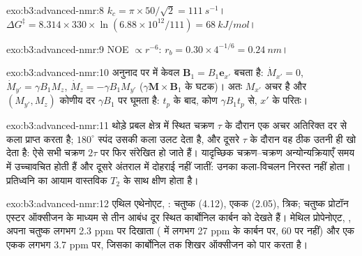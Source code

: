 \begin{solution}{exo:b3:advanced-nmr:8}
$k_c = \pi \times 50/\sqrt2 = \qty{111}{s^{-1}}$। $\Delta G^\ddagger = 8.314 \times 330 \times
\ln(6.88\times10^{12}/111) = \qty{68}{kJ/mol}$।
\end{solution}

\begin{solution}{exo:b3:advanced-nmr:9}
NOE $\propto r^{-6}$: $r_b = 0.30 \times 4^{-1/6} = \qty{0.24}{nm}$।
\end{solution}

\begin{solution}{exo:b3:advanced-nmr:10}
अनुनाद पर  में केवल $\mathbf B_1 = B_1\mathbf e_{x'}$ बचता है:
$\dot M_{x'} = 0$, $\dot M_{y'} = \gamma B_1M_z$, $\dot M_z = -\gamma B_1M_{y'}$
($\gamma\mathbf M\times\mathbf B_1$ के घटक)। अतः $M_{x'}$ अचर है और $(M_{y'}, M_z)$ कोणीय
दर $\gamma B_1$ पर घूमता है: $t_p$ के बाद, कोण $\gamma B_1t_p$ से, $x'$ के परितः।
\end{solution}

\begin{solution}{exo:b3:advanced-nmr:11}
थोड़े प्रबल क्षेत्र में स्थित चक्रण
$\tau$ के दौरान एक अचर अतिरिक्त दर से कला प्राप्त करता है; $180^\circ$ स्पंद उसकी कला उलट देता है, और
दूसरे $\tau$ के दौरान वह ठीक उतनी ही खो देता है: ऐसे सभी चक्रण $2\tau$ पर फिर संरेखित हो जाते हैं। यादृच्छिक चक्रण--चक्रण
अन्योन्यक्रियाएँ समय में उच्चावचित होती हैं और दूसरे अंतराल में दोहराई नहीं जातीं: उनका
कला-विचलन निरस्त नहीं होता। प्रतिध्वनि का आयाम वास्तविक $T_2$ के साथ क्षीण होता है।
\end{solution}

\begin{solution}{exo:b3:advanced-nmr:12}
एथिल एथेनोएट, :  चतुष्क (4.12),  एकक (2.05),
 त्रिक; चतुष्क प्रोटॉन एस्टर ऑक्सीजन के माध्यम से तीन आबंध दूर स्थित
कार्बोनिल कार्बन को देखते हैं। मेथिल प्रोपेनोएट, , अपना
चतुष्क लगभग 2.3 ppm पर दिखाता ( में लगभग 27 ppm के कार्बन पर, 60 पर नहीं) और एक एकक
 लगभग 3.7 ppm पर, जिसका कार्बोनिल तक  शिखर ऑक्सीजन को पार करता है।
\end{solution}

